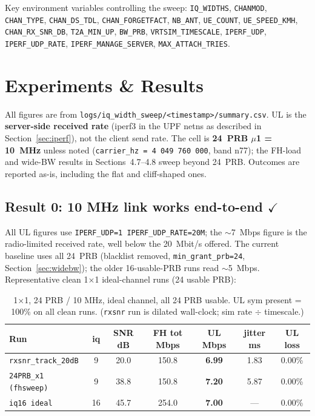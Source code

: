 \documentclass[11pt,a4paper]{article}
\newcommand{\yes}{\textcolor{closedcol}{\ensuremath{\checkmark}}}
\begin{document}
Key environment variables controlling the sweep:
\texttt{IQ\_WIDTHS}, \texttt{CHANMOD}, \texttt{CHAN\_TYPE}, \texttt{CHAN\_DS\_TDL},
\texttt{CHAN\_FORGETFACT}, \texttt{NB\_ANT}, \texttt{UE\_COUNT},
\texttt{UE\_SPEED\_KMH}, \texttt{CHAN\_RX\_SNR\_DB}, \texttt{T2A\_MIN\_UP},
\texttt{BW\_PRB}, \texttt{VRTSIM\_TIMESCALE}, \texttt{IPERF\_UDP},
\texttt{IPERF\_UDP\_RATE}, \texttt{IPERF\_MANAGE\_SERVER},
\texttt{MAX\_ATTACH\_TRIES}.

\section{Experiments \& Results}

All figures are from \texttt{logs/iq\_width\_sweep/<timestamp>/summary.csv}.
UL is the \textbf{server-side received rate} (iperf3 in the UPF netns as described in
Section~\ref{sec:iperf}), not the client send rate.
The cell is \textbf{24~PRB $\mu$1 = 10~MHz} unless noted
(\texttt{carrier\_hz = 4\,049\,760\,000}, band n77); the FH-load and wide-BW results in
Sections~4.7--4.8 sweep beyond 24~PRB.
Outcomes are reported as-is, including the flat and cliff-shaped ones.

\subsection{Result 0: 10 MHz link works end-to-end \texorpdfstring{\yes}{[OK]}}

All UL figures use \texttt{IPERF\_UDP=1 IPERF\_UDP\_RATE=20M}; the $\sim$7~Mbps figure is
the radio-limited received rate, well below the 20~Mbit/s offered. The current baseline uses
all 24~PRB (blacklist removed, \texttt{min\_grant\_prb=24}, Section~\ref{sec:widebw}); the
older 16-usable-PRB runs read $\sim$5~Mbps.
Representative clean 1$\times$1 ideal-channel runs (24 usable PRB):

\begin{table}[h]\centering\small
\begin{tabular}{@{}l c c c c c c@{}}
\toprule
\textbf{Run} & \textbf{iq} & \textbf{SNR dB} & \textbf{FH tot Mbps}
  & \textbf{UL Mbps} & \textbf{jitter ms} & \textbf{UL loss} \\
\midrule
\texttt{rxsnr\_track\_20dB} & 9  & 20.0 & 150.8 & \textbf{6.99} & 1.83 & 0.00\% \\
\texttt{24PRB\_x1 (fhsweep)} & 9  & 38.8 & 150.8 & \textbf{7.20} & 5.87 & 0.00\% \\
\texttt{iq16 ideal}         & 16 & 45.7 & 254.0 & \textbf{7.00} & ---  & 0.00\% \\
\bottomrule
\end{tabular}
\caption*{\small 1$\times$1, 24 PRB / 10 MHz, ideal channel, all 24 PRB usable.
UL sym present = 100\% on all clean runs. (\texttt{rxsnr} run is dilated wall-clock; sim rate $\div$ timescale.)}
\end{table}
\end{document}
